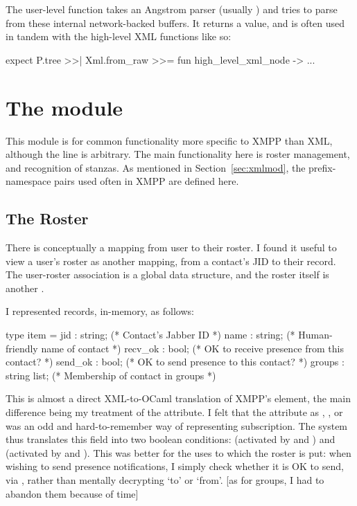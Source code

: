 \documentclass[12pt,a4paper,twoside,openright]{report}
\begin{document}
{The user-level  function takes an Angstrom parser (usually ) and tries to parse from these internal network-backed buffers. It returns a  value, and is often used in tandem with the high-level XML functions like so:

\begin{ocaml}
expect P.tree >>| Xml.from_raw >>= fun high_level_xml_node -> ...
\end{ocaml}

\section{The  module}
This module is for common functionality more specific to XMPP than XML, although the line is arbitrary. The main functionality here is roster management, and recognition of stanzas. As mentioned in Section~\ref{sec:xmlmod}, the prefix-namespace pairs used often in XMPP are defined here.

\subsection{The Roster}
There is conceptually a mapping from user to their roster. I found it useful to view a user's roster as another mapping, from a contact's JID to their  record. The user-roster association is a global  data structure, and the roster itself is another .

I represented  records, in-memory, as follows:

\hspace*{-\parindent}%
\begin{minipage}{\linewidth}
  \begin{ocaml}
    type item = {
      jid     : string;        (* Contact's Jabber ID                       *)
      name    : string;        (* Human-friendly name of contact            *)
      recv_ok : bool;          (* OK to receive presence from this contact? *)
      send_ok : bool;          (* OK to send presence to this contact?      *)
      groups  : string list; (* Membership of contact in groups           *)
    }
  \end{ocaml}
\end{minipage}

This is almost a direct XML-to-OCaml translation of XMPP's  element, the main difference being my treatment of the  attribute. I felt that the  attribute as , ,  or  was an odd and hard-to-remember way of representing subscription. The system thus translates this field into two boolean conditions:  (activated by  and ) and  (activated by  and ). This was better for the uses to which the roster is put: when wishing to send presence notifications, I simply check whether it is OK to send, via , rather than mentally decrypting `to' or `from'. [as for groups, I had to abandon them because of time]

}
\end{document}
